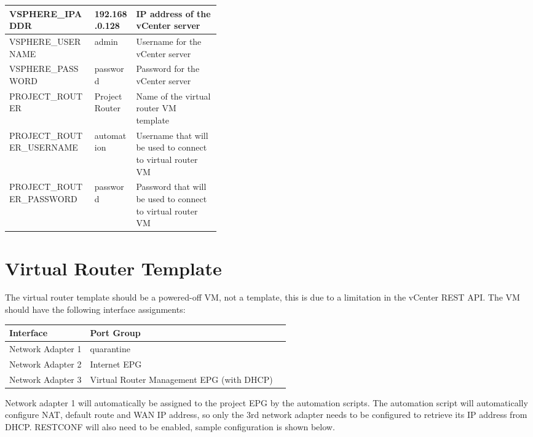 \begin{table}[H]
\begin{tabular}{l l p{0.4\linewidth}}
        
        VSPHERE\_IPADDR           & 192.168.0.128    & IP address of the vCenter server                                                                                    \\            \hline
        
        VSPHERE\_USERNAME         & admin            & Username for the vCenter server                                                                                     \\            \hline
        
        VSPHERE\_PASSWORD         & password         & Password for the vCenter server                                                                                     \\            \hline
        
        PROJECT\_ROUTER           & ProjectRouter    & Name of the virtual router VM template                                                                              \\        \hline
        PROJECT\_ROUTER\_USERNAME & automation       & Username that will be used to connect to virtual router VM                                                          \\ \hline
        PROJECT\_ROUTER\_PASSWORD & password         & Password that will be used to connect to virtual router VM                                                          \\ \hline
    \end{tabular}
\end{table}

\section*{Virtual Router Template}
The virtual router template should be a powered-off VM, not a template, this is due to a limitation in the vCenter REST API. The VM should have the following interface assignments:
\begin{table}[H]
    \centering
    \begin{tabular}{l l l}
        \textbf{Interface} & \textbf{Port Group}                       \\
        \hline
        Network Adapter 1  & quarantine                                \\
        Network Adapter 2  & Internet EPG                              \\
        Network Adapter 3  & Virtual Router Management EPG (with DHCP) \\
    \end{tabular}
\end{table}
Network adapter 1 will automatically be assigned to the project EPG by the automation scripts. The automation script will automatically configure NAT, default route and WAN IP address, so only the 3rd network adapter needs to be configured to retrieve its IP address from DHCP. RESTCONF will also need to be enabled, sample configuration is shown below.


